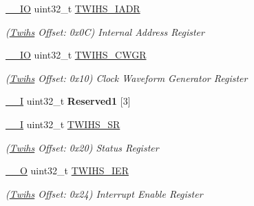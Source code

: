 \begin{DoxyCompactItemize}
\mbox{\label{structTwihs_a37d8da28028ed81e2c53aed636cb1e5a}} 
\mbox{\hyperlink{core__cm7_8h_aec43007d9998a0a0e01faede4133d6be}{\+\_\+\+\_\+\+IO}} uint32\+\_\+t \mbox{\hyperlink{structTwihs_a37d8da28028ed81e2c53aed636cb1e5a}{T\+W\+I\+H\+S\+\_\+\+I\+A\+DR}}
\begin{DoxyCompactList}\small\item\em (\mbox{\hyperlink{structTwihs}{Twihs}} Offset\+: 0x0C) Internal Address Register \end{DoxyCompactList}\item 
\mbox{\label{structTwihs_a16235d4eac6a96a31735362dc2aeec55}} 
\mbox{\hyperlink{core__cm7_8h_aec43007d9998a0a0e01faede4133d6be}{\+\_\+\+\_\+\+IO}} uint32\+\_\+t \mbox{\hyperlink{structTwihs_a16235d4eac6a96a31735362dc2aeec55}{T\+W\+I\+H\+S\+\_\+\+C\+W\+GR}}
\begin{DoxyCompactList}\small\item\em (\mbox{\hyperlink{structTwihs}{Twihs}} Offset\+: 0x10) Clock Waveform Generator Register \end{DoxyCompactList}\item 
\mbox{\label{structTwihs_adace62d64036065314f0053043098bc4}} 
\mbox{\hyperlink{core__cm7_8h_af63697ed9952cc71e1225efe205f6cd3}{\+\_\+\+\_\+I}} uint32\+\_\+t {\bfseries Reserved1} \mbox{[}3\mbox{]}
\item 
\mbox{\label{structTwihs_adf6a3a75348dbacb0e4d0ac179a54e2a}} 
\mbox{\hyperlink{core__cm7_8h_af63697ed9952cc71e1225efe205f6cd3}{\+\_\+\+\_\+I}} uint32\+\_\+t \mbox{\hyperlink{structTwihs_adf6a3a75348dbacb0e4d0ac179a54e2a}{T\+W\+I\+H\+S\+\_\+\+SR}}
\begin{DoxyCompactList}\small\item\em (\mbox{\hyperlink{structTwihs}{Twihs}} Offset\+: 0x20) Status Register \end{DoxyCompactList}\item 
\mbox{\label{structTwihs_a78d6370595e52dec29e80e6b2d0ee22b}} 
\mbox{\hyperlink{core__cm7_8h_a7e25d9380f9ef903923964322e71f2f6}{\+\_\+\+\_\+O}} uint32\+\_\+t \mbox{\hyperlink{structTwihs_a78d6370595e52dec29e80e6b2d0ee22b}{T\+W\+I\+H\+S\+\_\+\+I\+ER}}
\begin{DoxyCompactList}\small\item\em (\mbox{\hyperlink{structTwihs}{Twihs}} Offset\+: 0x24) Interrupt Enable Register \end{DoxyCompactList}\item 

\end{DoxyCompactItemize}
